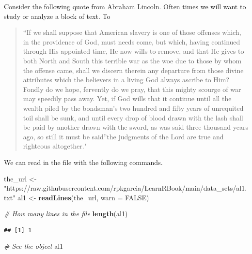 \documentclass[
]{book}
\newenvironment{Shaded}{\begin{snugshade}}{\end{snugshade}}
\newcommand{\CommentTok}[1]{\textcolor[rgb]{0.56,0.35,0.01}{\textit{#1}}}
\newcommand{\DataTypeTok}[1]{\textcolor[rgb]{0.13,0.29,0.53}{#1}}
\newcommand{\KeywordTok}[1]{\textcolor[rgb]{0.13,0.29,0.53}{\textbf{#1}}}
\newcommand{\NormalTok}[1]{#1}
\newcommand{\OtherTok}[1]{\textcolor[rgb]{0.56,0.35,0.01}{#1}}
\newcommand{\StringTok}[1]{\textcolor[rgb]{0.31,0.60,0.02}{#1}}
\begin{document}
Consider the following quote from Abraham Lincoln. Often times we will want to study or analyze a block of text. To

\begin{quote}
``If we shall suppose that American slavery is one of those
offenses which, in the providence of God, must needs come, but which, having
continued through His appointed time, He now wills to remove, and that He
gives to both North and South this terrible war as the woe due to those by
whom the offense came, shall we discern therein any departure from those
divine attributes which the believers in a living God always ascribe to Him?
Fondly do we hope, fervently do we pray, that this mighty scourge of war may
speedily pass away. Yet, if God wills that it continue until all the wealth
piled by the bondsman's two hundred and fifty years of unrequited toil shall
be sunk, and until every drop of blood drawn with the lash shall be paid by
another drawn with the sword, as was said three thousand years ago, so still
it must be said''the judgments of the Lord are true and righteous
altogether."
\end{quote}

We can read in the file with the following commands.

\begin{Shaded}
\begin{Highlighting}[]
\NormalTok{the_url <-}\StringTok{ "https://raw.githubusercontent.com/rpkgarcia/LearnRBook/main/data_sets/al1.txt"}
\NormalTok{al1 <-}\StringTok{ }\KeywordTok{readLines}\NormalTok{(the_url, }\DataTypeTok{warn =} \OtherTok{FALSE}\NormalTok{)}

\CommentTok{# How many lines in the file}
\KeywordTok{length}\NormalTok{(al1)}
\end{Highlighting}
\end{Shaded}

\begin{verbatim}
## [1] 1
\end{verbatim}

\begin{Shaded}
\begin{Highlighting}[]
\CommentTok{# See the object}
\NormalTok{al1}
\end{Highlighting}
\end{Shaded}
\end{document}
